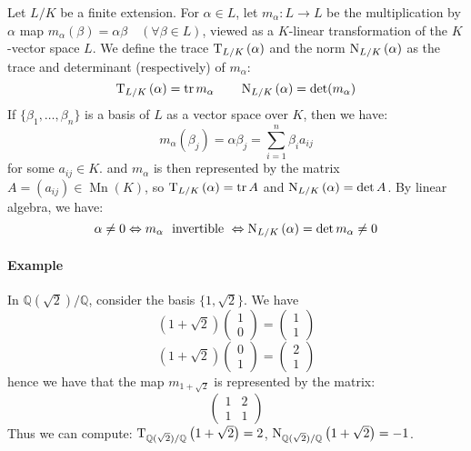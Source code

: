 \begin{definition}
  \label{def:94}
  Let $L/K$ be a finite extension. For $\alpha \in L$, let $m_\alpha : L \rightarrow L$ be the multiplication by $\alpha$ map $m_\alpha(\beta) = \alpha\beta \quad (\forall \beta \in L)$, viewed as a $K$-linear transformation of the $K$-vector space $L$. We define the trace $\operatorname{T}_{L/K}\left(\alpha\right)$ and the norm $\operatorname{N}_{L/K}\left(\alpha\right)$ as the trace and determinant (respectively) of $m_\alpha$:
\[
\operatorname{T}_{L/K}\left(\alpha\right) = \operatorname{tr} m_\alpha \qquad \operatorname{N}_{L/K}\left(\alpha\right) = \det (m_\alpha)
\]
If $\{ \beta_1, \dotsc, \beta_n \}$ is a basis of $L$ as a vector space over $K$, then we have:
\[
m_\alpha(\beta_j) = \alpha\beta_j = \sum_{i=1}^{n}\beta_ia_{ij}
\]
for some $a_{ij} \in K$. and $m_\alpha$ is then represented by the matrix $A = (a_{ij}) \in \operatorname{Mn}(K)$, so $\operatorname{T}_{L/K}\left(\alpha\right) = \operatorname{tr} A$ and $\operatorname{N}_{L/K}\left(\alpha\right) = \det A$. By linear algebra, we have:
\[
\alpha \neq 0 \Leftrightarrow m_\alpha \ \text{ invertible } \Leftrightarrow \operatorname{N}_{L/K}\left(\alpha\right) = \det m_\alpha \neq 0
\]
\end{definition}

\paragraph{Example}

In $\mathbb{Q}(\sqrt{2})/\mathbb{Q}$, consider the basis $\{ 1, \sqrt{2} \}$. We have 
\[
(1 + \sqrt{2}) \begin{pmatrix}1\\0\end{pmatrix} = \begin{pmatrix}1\\1\end{pmatrix}
\]
\[
(1 + \sqrt{2}) \begin{pmatrix} 0 \\ 1 \end{pmatrix} = \begin{pmatrix} 2 \\ 1 \end{pmatrix}
\]
hence we have that the map $m_{1+\sqrt{2}}$ is represented by the matrix:
\[
\begin{pmatrix}
1 & 2 \\
1 & 1
\end{pmatrix}
\]
Thus we can compute: $\operatorname{T}_{\mathbb{Q}(\sqrt{2})/\mathbb{Q}}\left(1+\sqrt{2}\right) = 2$, $\operatorname{N}_{\mathbb{Q}(\sqrt{2})/\mathbb{Q}}\left(1+\sqrt{2}\right) = -1$.

